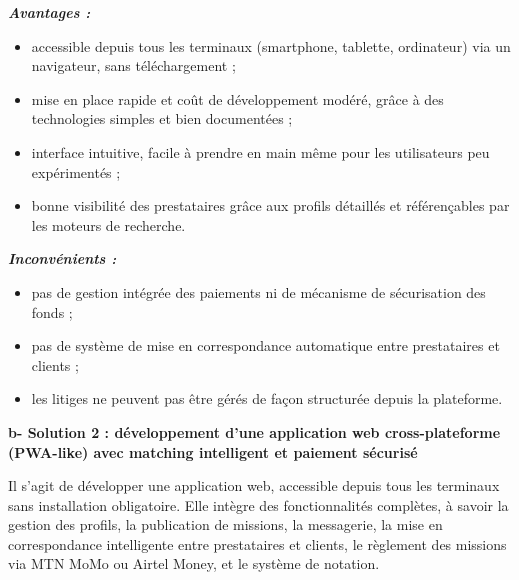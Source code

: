 \vspace{0.2cm}
\textit{\textbf{\textcolor{vertCongo}{Avantages :}}}
\begin{itemize}
	\item accessible depuis tous les terminaux (smartphone, tablette, ordinateur) via un navigateur, sans téléchargement ;
	\item mise en place rapide et coût de développement modéré, grâce à des technologies simples et bien documentées ;
	\item interface intuitive, facile à prendre en main même pour les utilisateurs peu expérimentés ;
	\item bonne visibilité des prestataires grâce aux profils détaillés et référençables par les moteurs de recherche.
\end{itemize}

\vspace{0.1cm}
\textit{\textbf{\textcolor{vertCongo}{Inconvénients :}}}
\begin{itemize}
	\item pas de gestion intégrée des paiements ni de mécanisme de sécurisation des fonds ;
	\item pas de système de mise en correspondance automatique entre prestataires et clients ;
	\item les litiges ne peuvent pas être gérés de façon structurée depuis la plateforme.
\end{itemize}

\vspace{0.4cm}
\noindent\textbf{\textcolor{vertCongo}{b- Solution 2 : développement d'une application web cross-plateforme (PWA-like) avec matching intelligent et paiement sécurisé}}

\vspace{0.3cm}
Il s'agit de développer une application web, accessible depuis tous les terminaux sans installation obligatoire. Elle intègre des fonctionnalités complètes, à savoir la gestion des profils, la publication de missions, la messagerie, la mise en correspondance intelligente entre prestataires et clients, le règlement des missions via MTN MoMo ou Airtel Money, et le système de notation.

